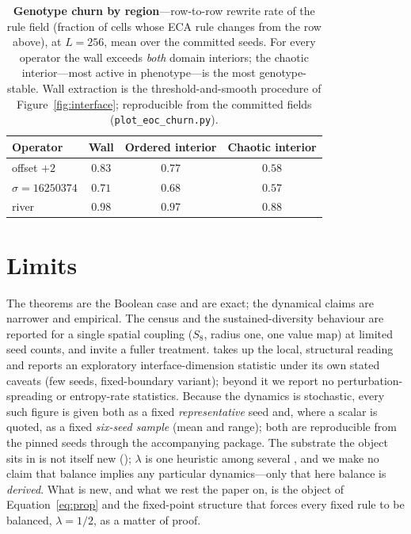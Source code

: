\documentclass[man,12pt,floatsintext]{apa7}
\newcommand{\secref}[1]{\emph{\nameref{#1}}}
\begin{document}
\begin{table}[tb]
\centering
\caption{\textbf{Genotype churn by region}---row-to-row rewrite rate of the rule
field (fraction of cells whose ECA rule changes from the row above), at
$L = 256$, mean over the committed seeds. For every operator the wall exceeds
\emph{both} domain interiors; the chaotic interior---most active in
phenotype---is the most genotype-stable. Wall extraction is the
threshold-and-smooth procedure of Figure~\ref{fig:interface}; reproducible from
the committed fields (\texttt{plot\_eoc\_churn.py}).}
\label{tab:churn}
\begin{tabular}{lccc}
\toprule
Operator & Wall & Ordered interior & Chaotic interior \\
\midrule
offset $+2$          & $0.83$ & $0.77$ & $0.58$ \\
$\sigma = 16250374$  & $0.71$ & $0.68$ & $0.57$ \\
river                & $0.98$ & $0.97$ & $0.88$ \\
\bottomrule
\end{tabular}
\end{table}

\section{Limits}
\label{sec:limits}

The theorems are the Boolean case and are exact; the dynamical claims are
narrower and empirical. The census and the sustained-diversity behaviour are
reported for a single spatial coupling ($S_8$, radius one, one value map) at
limited seed counts, and invite a fuller treatment. \secref{sec:discussion}
takes up the local, structural reading and reports an exploratory
interface-dimension statistic under its own stated caveats (few seeds,
fixed-boundary variant); beyond it we report no perturbation-spreading or
entropy-rate statistics.
Because the dynamics is stochastic, every such figure is given both as a
fixed \emph{representative} seed and, where a scalar is quoted, as a fixed
\emph{six-seed sample} (mean and range); both are reproducible from the
pinned seeds through the accompanying package. The
substrate the object sits in is not itself new (\secref{sec:object}); $\lambda$
is one heuristic among several \parencite{wuensche1999classifying}, and we
make no claim that balance implies any particular dynamics---only that here
balance is \emph{derived}. What is new, and what we rest the paper on, is the
object of Equation~\eqref{eq:prop} and the fixed-point structure that forces
every fixed rule to be balanced, $\lambda = 1/2$, as a matter of proof.
\end{document}

